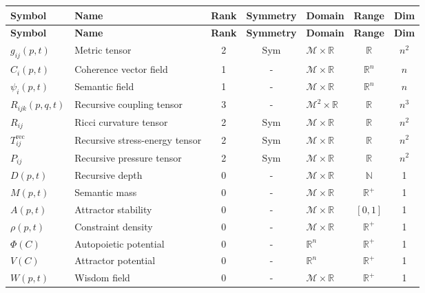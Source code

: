 {\scriptsize
\renewcommand{\arraystretch}{0.9}
\begin{longtable}{|p{2.5cm}|p{4cm}|c|c|p{2.5cm}|c|c|}
\hline
\textbf{Symbol} & \textbf{Name} & \textbf{Rank} & \textbf{Symmetry} & \textbf{Domain} & \textbf{Range} & \textbf{Dim} \\
\hline
\endfirsthead
\hline
\textbf{Symbol} & \textbf{Name} & \textbf{Rank} & \textbf{Symmetry} & \textbf{Domain} & \textbf{Range} & \textbf{Dim} \\
\hline
\endhead
\hline
\(g_{ij}(p,t)\) & Metric tensor & 2 & Sym & \(\mathcal{M} \times \mathbb{R}\) & \(\mathbb{R}\) & \(n^2\) \\
\hline
\(C_i(p,t)\) & Coherence vector field & 1 & - & \(\mathcal{M} \times \mathbb{R}\) & \(\mathbb{R}^n\) & \(n\) \\
\hline
\(\psi_i(p,t)\) & Semantic field & 1 & - & \(\mathcal{M} \times \mathbb{R}\) & \(\mathbb{R}^n\) & \(n\) \\
\hline
\(R_{ijk}(p,q,t)\) & Recursive coupling tensor & 3 & - & \(\mathcal{M}^2 \times \mathbb{R}\) & \(\mathbb{R}\) & \(n^3\) \\
\hline
\(R_{ij}\) & Ricci curvature tensor \autocite{RicciLeviCivita1901} & 2 & Sym & \(\mathcal{M} \times \mathbb{R}\) & \(\mathbb{R}\) & \(n^2\) \\
\hline
\(T_{ij}^{\text{rec}}\) & Recursive stress-energy tensor & 2 & Sym & \(\mathcal{M} \times \mathbb{R}\) & \(\mathbb{R}\) & \(n^2\) \\
\hline
\(P_{ij}\) & Recursive pressure tensor & 2 & Sym & \(\mathcal{M} \times \mathbb{R}\) & \(\mathbb{R}\) & \(n^2\) \\
\hline
\(D(p,t)\) & Recursive depth & 0 & - & \(\mathcal{M} \times \mathbb{R}\) & \(\mathbb{N}\) & 1 \\
\hline
\(M(p,t)\) & Semantic mass & 0 & - & \(\mathcal{M} \times \mathbb{R}\) & \(\mathbb{R}^+\) & 1 \\
\hline
\(A(p,t)\) & Attractor stability & 0 & - & \(\mathcal{M} \times \mathbb{R}\) & \([0,1]\) & 1 \\
\hline
\(\rho(p,t)\) & Constraint density & 0 & - & \(\mathcal{M} \times \mathbb{R}\) & \(\mathbb{R}^+\) & 1 \\
\hline
\(\Phi(C)\) & Autopoietic potential & 0 & - & \(\mathbb{R}^n\) & \(\mathbb{R}^+\) & 1 \\
\hline
\(V(C)\) & Attractor potential & 0 & - & \(\mathbb{R}^n\) & \(\mathbb{R}^+\) & 1 \\
\hline
\(W(p,t)\) & Wisdom field & 0 & - & \(\mathcal{M} \times \mathbb{R}\) & \(\mathbb{R}^+\) & 1 \\

\end{longtable}}

